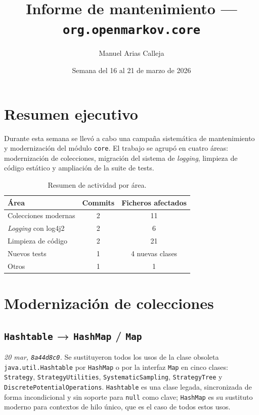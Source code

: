 \documentclass[11pt,a4paper]{article}
\title{Informe de mantenimiento — \texttt{org.openmarkov.core}}
\author{Manuel Arias Calleja}
\date{Semana del 16 al 21 de marzo de 2026}
\begin{document}
\maketitle

\section*{Resumen ejecutivo}

Durante esta semana se llevó a cabo una campaña sistemática de mantenimiento y modernización del
módulo \texttt{core}. El trabajo se agrupó en cuatro áreas: modernización de colecciones,
migración del sistema de \emph{logging}, limpieza de código estático y ampliación de la suite de
tests.

\begin{table}[!htbp]
\centering
\begin{tabular}{lcc}
\toprule
\textbf{Área} & \textbf{Commits} & \textbf{Ficheros afectados} \\
\midrule
Colecciones modernas & 2 & 11 \\
\emph{Logging} con log4j2 & 2 & 6 \\
Limpieza de código & 2 & 21 \\
Nuevos tests & 1 & 4 nuevas clases \\
Otros & 1 & 1 \\
\bottomrule
\end{tabular}
\caption{Resumen de actividad por área.}
\end{table}

\section{Modernización de colecciones}

\subsection{\texttt{Hashtable} → \texttt{HashMap} / \texttt{Map}}

\emph{20 mar, \texttt{8a44d8c0}.}
Se sustituyeron todos los usos de la clase obsoleta \texttt{java.util.Hashtable} por
\texttt{HashMap} o por la interfaz \texttt{Map} en cinco clases: \texttt{Strategy},
\texttt{StrategyUtilities}, \texttt{SystematicSampling}, \texttt{StrategyTree} y
\texttt{DiscretePotentialOperations}. \texttt{Hashtable} es una clase legada, sincronizada de
forma incondicional y sin soporte para \texttt{null} como clave; \texttt{HashMap} es su sustituto
moderno para contextos de hilo único, que es el caso de todos estos usos.
\end{document}
